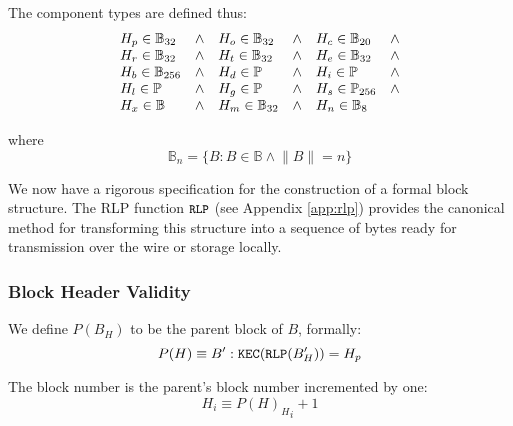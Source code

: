 \documentclass[UTF8,nofonts]{ctexart}
\begin{document}
\begin{multicols}{2}
The component types are defined thus:
\begin{equation}
\begin{array}[t]{lclclcl}
H_p \in \mathbb{B}_{32} & \wedge & H_o \in \mathbb{B}_{32} & \wedge & H_c \in \mathbb{B}_{20} & \wedge \\
H_r \in \mathbb{B}_{32} & \wedge & H_t \in \mathbb{B}_{32} & \wedge & H_e \in \mathbb{B}_{32} & \wedge \\
H_b \in \mathbb{B}_{256} & \wedge & H_d \in \mathbb{P} & \wedge & H_i \in \mathbb{P} & \wedge \\
H_l \in \mathbb{P} & \wedge & H_g \in \mathbb{P} & \wedge & H_s \in \mathbb{P}_{256} & \wedge \\
H_x \in \mathbb{B} & \wedge & H_m \in \mathbb{B}_{32} & \wedge & H_n \in \mathbb{B}_{8}
\end{array}
\end{equation}

where
\begin{equation}
\mathbb{B}_n = \{ B: B \in \mathbb{B} \wedge \lVert B \rVert = n \}
\end{equation}

We now have a rigorous specification for the construction of a formal block structure. The RLP function $\texttt{\small RLP}$ (see Appendix \ref{app:rlp}) provides the canonical method for transforming this structure into a sequence of bytes ready for transmission over the wire or storage locally.

\subsubsection{Block Header Validity}

We define $P(B_H)$ to be the parent block of $B$, formally:
\begin{equation}
P(H) \equiv B': \mathtt{\tiny KEC}(\mathtt{\tiny RLP}(B'_H)) = H_p
\end{equation}

The block number is the parent's block number incremented by one:
\begin{equation}
H_i \equiv {{P(H)_H}_i} + 1
\end{equation}

\newcommand{\mindifficulty}{D_0}
\newcommand{\frontiermod}{\ensuremath{\varsigma_1}}
\newcommand{\homesteadmod}{\ensuremath{\varsigma_2}}
\newcommand{\expdiffsymb}{\ensuremath{\epsilon}}
\newcommand{\diffadjustment}{x}


\end{multicols}
\end{document}
